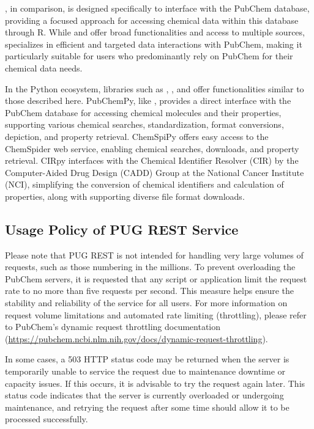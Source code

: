 , in comparison, is designed specifically to interface with the PubChem database, providing a focused approach for accessing chemical data within this database through R. While  and  offer broad functionalities and access to multiple sources,  specializes in efficient and targeted data interactions with PubChem, making it particularly suitable for users who predominantly rely on PubChem for their chemical data needs.

In the Python ecosystem, libraries such as  \citep{swain2014pubchempy},  \citep{swain2012chemspipy}, and  \citep{swain2016cirpy} offer functionalities similar to those described here. PubChemPy, like , provides a direct interface with the PubChem database for accessing chemical molecules and their properties, supporting various chemical searches, standardization, format conversions, depiction, and property retrieval. ChemSpiPy offers easy access to the ChemSpider web service, enabling chemical searches, downloads, and property retrieval. CIRpy interfaces with the Chemical Identifier Resolver (CIR) by the Computer-Aided Drug Design (CADD) Group at the National Cancer Institute (NCI), simplifying the conversion of chemical identifiers and calculation of properties, along with supporting diverse file format downloads.

\hypertarget{usage-policy-of-pug-rest-service}{%
\subsection{Usage Policy of PUG REST Service}\label{usage-policy-of-pug-rest-service}}

Please note that PUG REST is not intended for handling very large volumes of requests, such as those numbering in the millions. To prevent overloading the PubChem servers, it is requested that any script or application limit the request rate to no more than five requests per second. This measure helps ensure the stability and reliability of the service for all users. For more information on request volume limitations and automated rate limiting (throttling), please refer to PubChem's dynamic request throttling documentation (\url{https://pubchem.ncbi.nlm.nih.gov/docs/dynamic-request-throttling}).

In some cases, a 503 HTTP status code may be returned when the server is temporarily unable to service the request due to maintenance downtime or capacity issues. If this occurs, it is advisable to try the request again later. This status code indicates that the server is currently overloaded or undergoing maintenance, and retrying the request after some time should allow it to be processed successfully.

